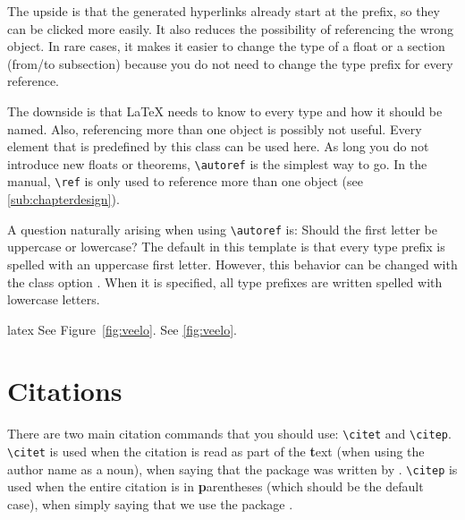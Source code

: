 The upside is that the generated hyperlinks already start at the prefix, so
they can be clicked more easily. It also reduces the possibility of
referencing the wrong object.  In rare cases, it makes it easier to change the
type of a float or a section (from/to subsection) because you do not need to
change the type prefix for every reference.

The downside is that \LaTeX{} needs to know to every type and how it should be
named.  Also, referencing more than one object is possibly not useful. Every
element that is predefined by this class can be used here. As long you do not
introduce new floats or theorems, \verb!\autoref! is the simplest way to go.
In the manual, \verb!\ref! is only used to reference more than one object (see
\autoref{sub:chapterdesign}).

A question naturally arising when using \verb!\autoref! is:  Should the first letter be uppercase or lowercase? The
default in this template is that every type prefix is spelled with an
uppercase first letter.  However, this behavior can be changed with the class
option . When it is specified, all
type prefixes are written spelled with lowercase letters.

\begin{algorithm}
    \label{alg:ref}
    \begin{code}{latex}
See Figure~\ref{fig:veelo}.
See \autoref{fig:veelo}.
    \end{code}
\end{algorithm}

\section{Citations}%
\label{sec:cite}

There are two main citation commands that you should use: \verb!\citet! and
\verb!\citep!.  \verb!\citet! is used when the citation is read as part of the
\textbf{t}ext (\ie when using the author name as a noun), \eg when
saying that the  package was written by \citet{web:biblatex}.
\verb!\citep! is used when the entire citation is in \textbf{p}arentheses
(which should be the default case), \eg when simply saying that we use the
 package \citep{web:biblatex}.

